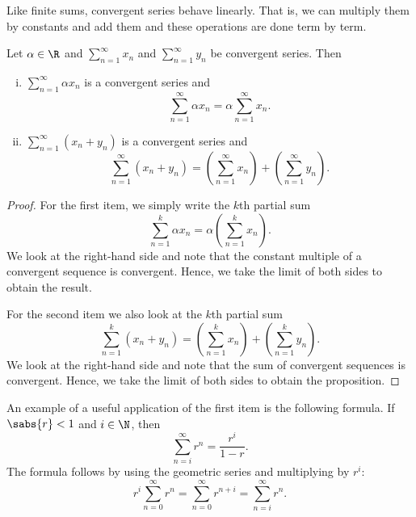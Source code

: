 Like finite sums, convergent series behave linearly.
That is, we can multiply them by constants
and add them and these operations are done term by term.

\begin{prop}
Let $\alpha \in \R$ and $\sum_{n=1}^\infty x_n$ and $\sum_{n=1}^\infty y_n$ be
convergent series.  Then
\begin{enumerate}[(i)]
\item
$\sum_{n=1}^\infty \alpha x_n$ is a convergent series and
\begin{equation*}
\sum_{n=1}^\infty \alpha x_n
=
\alpha \sum_{n=1}^\infty x_n .
\end{equation*}
\item
$\sum_{n=1}^\infty ( x_n + y_n )$ is a convergent series and
\begin{equation*}
\sum_{n=1}^\infty ( x_n + y_n ) 
=
\left( \sum_{n=1}^\infty x_n \right)
+
\left( \sum_{n=1}^\infty y_n \right) .
\end{equation*}
\end{enumerate}
\end{prop}

\begin{proof}
For the first item,
we simply write the $k$th partial sum
\begin{equation*}
\sum_{n=1}^k \alpha x_n
=
\alpha \left( \sum_{n=1}^k x_n \right) .
\end{equation*}
We look at the right-hand side and note that the constant multiple of
a convergent sequence
is convergent.  Hence, we take the limit of both sides to obtain
the result.

For the second item we also look at the
$k$th partial sum
\begin{equation*}
\sum_{n=1}^k ( x_n + y_n ) 
=
\left( \sum_{n=1}^k x_n \right)
+
\left( \sum_{n=1}^k y_n \right) .
\end{equation*}
We look at the right-hand side and note that the sum of convergent sequences
is convergent.  Hence, we take the limit of both sides to obtain
the proposition.
\end{proof}

An example of a useful application of the first item is the following
formula.  If $\sabs{r} < 1$ and $i \in \N$, then
\begin{equation*}
\sum_{n=i}^\infty r^n = \frac{r^i}{1-r} .
\end{equation*}
The formula follows by using the geometric series and multiplying by
$r^i$:
\begin{equation*}
r^i \sum_{n=0}^\infty r^n =
\sum_{n=0}^\infty r^{n+i}
=
\sum_{n=i}^\infty r^n .
\end{equation*}

